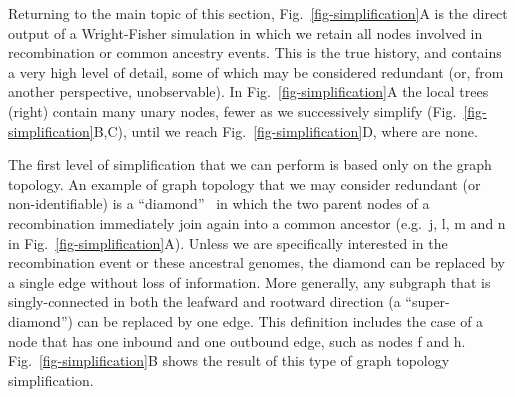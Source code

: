 \documentclass{article}
\newcommand{\noderef}[1]{\textsf{#1}}
\begin{document}
Returning to the main topic of this section,
Fig.~\ref{fig-simplification}A is the direct output of a Wright-Fisher
simulation in which we retain all nodes involved in recombination
or common ancestry events. This is the true history, and contains
a very high level of detail, some of which may be considered
redundant (or, from another perspective, unobservable).
In Fig.~\ref{fig-simplification}A the local trees (right)
contain many unary nodes, fewer as  we successively
simplify (Fig.~\ref{fig-simplification}B,C),
until we reach Fig.~\ref{fig-simplification}D, where are none.

The first level of simplification that we can perform is based only
on the graph topology.
An example of graph topology that we may consider redundant
(or non-identifiable) is a
``diamond''~\citep{rasmussen2014genome}
in which the two parent nodes of a recombination immediately
join again into a common ancestor (e.g.~\noderef{j}, \noderef{l}, \noderef{m}
and \noderef{n} in Fig.~\ref{fig-simplification}A).
Unless we are specifically
interested in the recombination event or these ancestral genomes,
the diamond can be replaced by a single edge without loss of
information.
More generally, any subgraph that is singly-connected in both the leafward and
rootward direction (a ``super-diamond'') can be replaced by one edge.
This definition includes the case
of a node that has one inbound and one outbound edge, such as
nodes \noderef{f} and \noderef{h}.
Fig.~\ref{fig-simplification}B shows the result of this type of
graph topology simplification.
\end{document}
